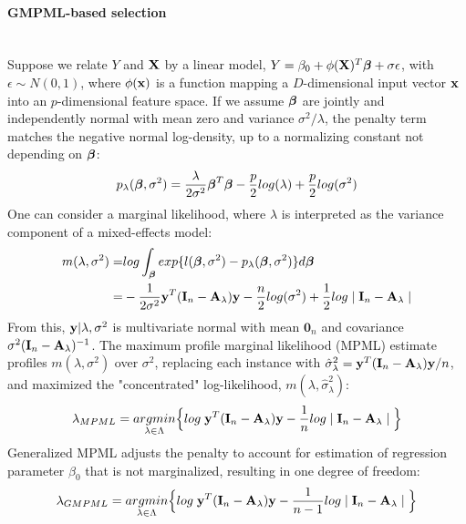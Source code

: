 \documentclass[11pt]{article}
\begin{document}
\paragraph{GMPML-based selection}\mbox{}\\
Suppose we relate $Y$ and ${\bf X}$ by a linear model, $Y=\beta_0+\phi({\bf X})^T\boldsymbol{\beta}+\sigma \epsilon$, with $\epsilon \sim N(0, 1)$, where $\phi({\bf x})$ is a function mapping a $D$-dimensional input vector ${\bf x}$ into an $p$-dimensional feature space. If we assume $\boldsymbol{\beta}$ are jointly and independently normal with mean zero and variance $\sigma^2/\lambda$, the penalty term matches the negative normal log-density, up to a normalizing constant not depending on $\boldsymbol{\beta}$:
\begin{align*}
p_\lambda(\boldsymbol{\beta}, \sigma^2)=\frac{\lambda}{2\sigma^2}\boldsymbol{\beta}^T\boldsymbol{\beta}-\frac{p}{2}log(\lambda)+\frac{p}{2}log(\sigma^2)
\end{align*}
One can consider a marginal likelihood, where $\lambda$ is interpreted as the variance component of a mixed-effects model:
\begin{align*}
m(\lambda, \sigma^2)=&log \int_{\boldsymbol{\beta}} exp\{ l(\boldsymbol{\beta}, \sigma^2)-p_\lambda(\boldsymbol{\beta}, \sigma^2)\}d\boldsymbol{\beta} \\=&-\frac{1}{2\sigma^2}{\bf y}^T({\bf I}_n-{\bf A}_\lambda){\bf y}-\frac{n}{2}log(\sigma^2)+\frac{1}{2}log \mid {\bf I}_n-{\bf A}_\lambda \mid
\end{align*}
From this, ${\bf y} |\lambda, \sigma^2$ is multivariate normal with mean $\mathbf{0}_n$ and covariance $\sigma^2({\bf I}_n-{\bf A}_\lambda)^{-1}$. The maximum profile marginal likelihood (MPML) estimate profiles $m(\lambda, \sigma^2)$ over $\sigma^2$, replacing each instance with $\hat{\sigma}_\lambda^2={\bf y}^T({\bf I}_n-{\bf A}_\lambda){\bf y}/n$, and maximized the "concentrated" log-likelihood, $m(\lambda, \hat{\sigma}_\lambda^2)$:
\begin{align*}
\lambda_{MPML}=\underset{\lambda \in \Lambda}{argmin}\Big\{log\; {\bf y}^T({\bf I}_n-{\bf A}_\lambda){\bf y}-\frac{1}{n}log \mid {\bf I}_n-{\bf A}_\lambda \mid \Big\}
\end{align*}
Generalized MPML adjusts the penalty to account for estimation of regression parameter $\beta_0$ that is not marginalized, resulting in one degree of freedom:
\begin{align}
\lambda_{GMPML}=\underset{\lambda \in \Lambda}{argmin}\Big\{log\; {\bf y}^T({\bf I}_n-{\bf A}_\lambda){\bf y}-\frac{1}{n-1}log \mid {\bf I}_n-{\bf A}_\lambda \mid \Big\}
\end{align}

\vspace{2em}
\end{document}
